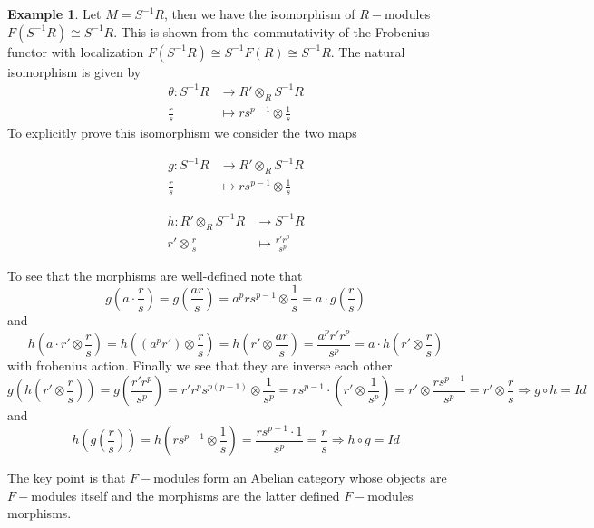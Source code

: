 \documentclass[leqno]{article}
\theoremstyle{definition}
\newtheorem{example}{Example}[section]
\begin{document}
\begin{example} Let  $M=S ^{-1}R$, then we have the isomorphism of $R-$modules $F(S^{-1}R)\cong S^{-1}R$. This is shown from the commutativity of the Frobenius functor with localization $F(S^{-1}R)\cong S^{-1}F(R)\cong S^{-1}R$. The natural isomorphism is given by
   \begin{align*}
	\theta : S ^{-1}R & \to R'\otimes _R S ^{-1}R\\
	\frac{r}{s} &\mapsto rs ^{p-1} \otimes \frac{1}{s}
   \end{align*}
To explicitly prove this isomorphism we consider the two maps

\begin{minipage}{0.5\textwidth}
   \begin{align*}
	g : S ^{-1}R & \to R'\otimes _R S ^{-1}R\\
	\frac{r}{s} &\mapsto rs ^{p-1} \otimes \frac{1}{s}
   \end{align*}
\end{minipage}
\begin{minipage}{0.5\textwidth}
   \begin{align*}
	 h : R'\otimes _R S ^{-1}R & \to  S^{-1}R\\
	 r' \otimes \frac{r}{s} & \mapsto \frac{r'r^p}{s^p}
   \end{align*}
\end{minipage}

To see that the morphisms are well-defined note that
\[
g\left(a \cdot \frac{r}{s}\right) = g\left(\frac{ar}{s}\right) = a^prs ^{p-1} \otimes \frac{1}{s} = a \cdot g\left(\frac{r}{s}\right)
\] 
and 
\[
h\left(a \cdot r'\otimes \frac{r}{s}\right) = h\left(\left(a^pr'\right)\otimes \frac{r}{s}\right) = h\left(r'\otimes \frac{ar}{s}\right) = \frac{a^pr'r^p}{s^p} = a\cdot h\left(r'\otimes \frac{r}{s}\right)
\] 
with frobenius action. Finally we see that they are inverse each other
\[
  g\left(h\left(r'\otimes \frac{r}{s}\right)\right) = g\left(\frac{r'r^p}{s^p}\right) = r'r^p s ^{p\left({p-1}\right)} \otimes \frac{1}{s^p} = rs^{p-1} \cdot \left(r' \otimes \frac{1}{s^p}\right) = r' \otimes \frac{rs ^{p-1}}{s^p} = r' \otimes \frac{r}{s} \Rightarrow g\circ h = Id
\] 
and 
\[
h\left( g \left( \frac{r}{s} \right)  \right) = h \left( rs ^{p-1} \otimes \frac{1}{s} \right) = \frac{rs ^{p-1}\cdot 1}{s^p} = \frac{r}{s} \Rightarrow h\circ g = Id
\] 
\end{example}

The key point is that $F-$modules form an Abelian category whose objects are  $F-$modules itself and the morphisms are the latter defined  $F-$modules morphisms.
\end{document}
